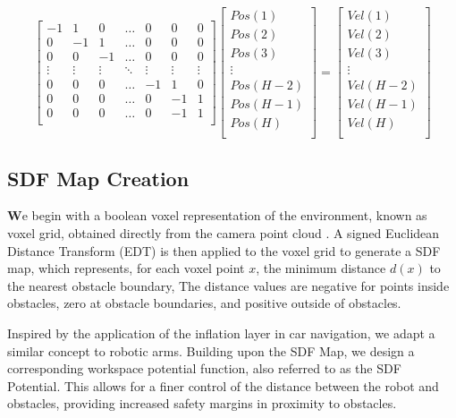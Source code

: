 \documentclass{article}
\begin{document}
	\[
	\begin{bmatrix}
		-1 & 1 & 0  & \ldots & 0 & 0 & 0  \\
		0 & -1 & 1  & \ldots & 0 & 0 & 0  \\
		0 & 0 & -1  & \ldots & 0 & 0 & 0  \\
		\vdots & \vdots & \vdots  & \ddots & \vdots & \vdots & \vdots \\
		0 & 0 & 0  & \ldots & -1 & 1 & 0  \\
		0 & 0 & 0  & \ldots & 0 & -1 & 1  \\
		0 & 0 & 0  & \ldots & 0 & -1 & 1  \\
	\end{bmatrix}
	\begin{bmatrix}
		Pos(1)  \\
		Pos(2)  \\
		Pos(3)  \\
		\vdots   \\
		Pos(H-2)  \\
		Pos(H-1)  \\
		Pos(H)  \\
	\end{bmatrix}
	=
	\begin{bmatrix}
		Vel(1)  \\
		Vel(2)  \\
		Vel(3)  \\
		\vdots   \\
		Vel(H-2)  \\
		Vel(H-1)  \\
		Vel(H)  \\
	\end{bmatrix}
	\]

	\subsection{SDF Map Creation}
	
	  \textbf{W}e begin with a boolean voxel representation of the environment, known as voxel grid, obtained directly from the camera point cloud .
	A signed Euclidean Distance Transform (EDT) is then applied to the voxel grid to generate a SDF map, which represents, for each voxel point $x$, the minimum distance $d(x)$ to the nearest obstacle boundary, The distance values are negative for points inside obstacles, zero at obstacle boundaries, and positive outside of obstacles.
	
	Inspired by the application of the inflation layer in car navigation, we adapt a similar concept to robotic arms. Building upon the SDF Map, we design a corresponding workspace potential function, also referred to as the SDF Potential. This allows for a finer control of the distance between the robot and obstacles, providing increased safety margins in proximity to obstacles.
	
\end{document}
